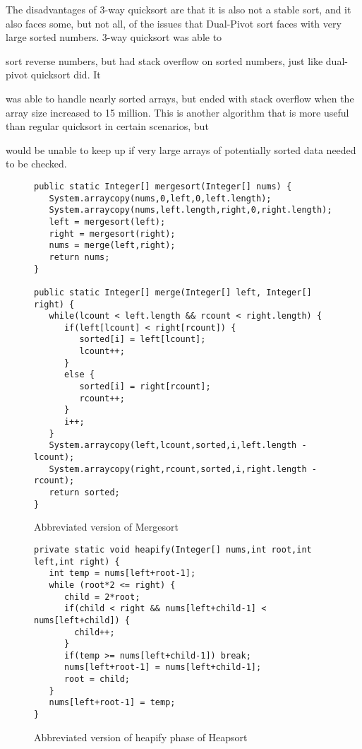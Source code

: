 \documentclass{article}
\begin{document}
The disadvantages of 3-way quicksort are that it is also not a stable sort, and it also faces some, but not
all, of the issues that Dual-Pivot sort faces with very large sorted numbers. 3-way quicksort was able to 

sort reverse numbers, but had stack overflow on sorted numbers, just like dual-pivot quicksort did. It 

was able to handle nearly sorted arrays, but ended with stack overflow when the array size increased to 
15 million. This is another algorithm that is more useful than regular quicksort in certain scenarios, but 

would be unable to keep up if very large arrays of potentially sorted data needed to be checked.
 
\begin{figure}
\begin{lstlisting}
public static Integer[] mergesort(Integer[] nums) { 
   System.arraycopy(nums,0,left,0,left.length);
   System.arraycopy(nums,left.length,right,0,right.length);
   left = mergesort(left);
   right = mergesort(right);
   nums = merge(left,right);
   return nums;
}

public static Integer[] merge(Integer[] left, Integer[] right) {
   while(lcount < left.length && rcount < right.length) {
      if(left[lcount] < right[rcount]) {
         sorted[i] = left[lcount];
         lcount++;
      }
      else {
         sorted[i] = right[rcount];
         rcount++;
      }
      i++;
   }
   System.arraycopy(left,lcount,sorted,i,left.length - lcount);
   System.arraycopy(right,rcount,sorted,i,right.length - rcount);
   return sorted;
}
\end{lstlisting}
\caption{Abbreviated version of Mergesort}
\label{code-mergesort}
\end{figure}

\begin{figure}
\begin{lstlisting}
private static void heapify(Integer[] nums,int root,int left,int right) {
   int temp = nums[left+root-1];
   while (root*2 <= right) {
      child = 2*root;
      if(child < right && nums[left+child-1] < nums[left+child]) {
        child++;
      }
      if(temp >= nums[left+child-1]) break;
      nums[left+root-1] = nums[left+child-1];
      root = child;
   }
   nums[left+root-1] = temp;
}
\end{lstlisting}
\caption{Abbreviated version of heapify phase of Heapsort}
\label{code-heapsort}
\end{figure}
\end{document}
